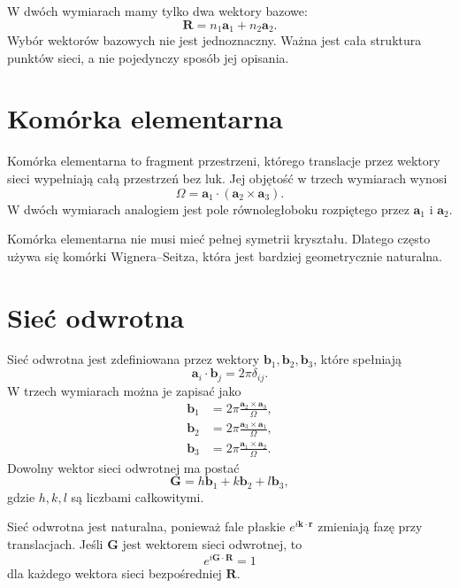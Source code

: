W dwóch wymiarach mamy tylko dwa wektory bazowe:
\begin{equation}
    \mathbf{R}=n_1\mathbf{a}_1+n_2\mathbf{a}_2.
\end{equation}
Wybór wektorów bazowych nie jest jednoznaczny. Ważna jest cała struktura punktów sieci, a nie pojedynczy sposób jej opisania.

\section{Komórka elementarna}

Komórka elementarna to fragment przestrzeni, którego translacje przez wektory sieci wypełniają całą przestrzeń bez luk. Jej objętość w trzech wymiarach wynosi
\begin{equation}
    \Omega=\mathbf{a}_1\cdot(\mathbf{a}_2\times\mathbf{a}_3).
\end{equation}
W dwóch wymiarach analogiem jest pole równoległoboku rozpiętego przez \(\mathbf{a}_1\) i \(\mathbf{a}_2\).

Komórka elementarna nie musi mieć pełnej symetrii kryształu. Dlatego często używa się komórki Wignera--Seitza, która jest bardziej geometrycznie naturalna.

\section{Sieć odwrotna}

Sieć odwrotna jest zdefiniowana przez wektory \(\mathbf{b}_1,\mathbf{b}_2,\mathbf{b}_3\), które spełniają
\begin{equation}
    \mathbf{a}_i\cdot\mathbf{b}_j=2\pi\delta_{ij}.
\end{equation}
W trzech wymiarach można je zapisać jako
\begin{align}
    \mathbf{b}_1&=2\pi\frac{\mathbf{a}_2\times\mathbf{a}_3}{\Omega},\\
    \mathbf{b}_2&=2\pi\frac{\mathbf{a}_3\times\mathbf{a}_1}{\Omega},\\
    \mathbf{b}_3&=2\pi\frac{\mathbf{a}_1\times\mathbf{a}_2}{\Omega}.
\end{align}
Dowolny wektor sieci odwrotnej ma postać
\begin{equation}
    \mathbf{G}=h\mathbf{b}_1+k\mathbf{b}_2+l\mathbf{b}_3,
\end{equation}
gdzie \(h,k,l\) są liczbami całkowitymi.

Sieć odwrotna jest naturalna, ponieważ fale płaskie \(e^{i\mathbf{k}\cdot\mathbf{r}}\) zmieniają fazę przy translacjach. Jeśli \(\mathbf{G}\) jest wektorem sieci odwrotnej, to
\begin{equation}
    e^{i\mathbf{G}\cdot\mathbf{R}}=1
\end{equation}
dla każdego wektora sieci bezpośredniej \(\mathbf{R}\).

